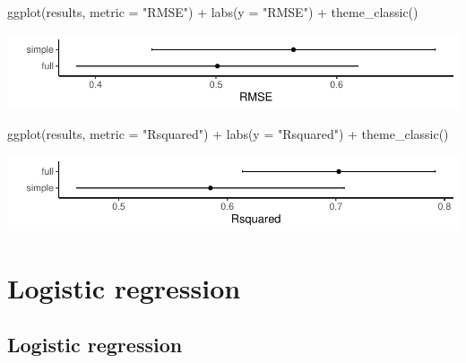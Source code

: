 \documentclass[a4paper]{article}\usepackage[]{graphicx}\usepackage[]{xcolor}
\makeatletter
\def\maxwidth{ %
  \ifdim\Gin@nat@width>\linewidth
    \linewidth
  \else
    \Gin@nat@width
  \fi
}
\makeatother
\begin{document}
\begin{Schunk}
{}

\begin{Sinput}
ggplot(results, metric = "RMSE") +
  labs(y = "RMSE") +
  theme_classic()
\end{Sinput}


{\centering \includegraphics[width=\maxwidth]{figure/listings-unnamed-chunk-407-2} 

}

\begin{Sinput}
ggplot(results, metric = "Rsquared") +
  labs(y = "Rsquared") +
  theme_classic()
\end{Sinput}


{\centering \includegraphics[width=\maxwidth]{figure/listings-unnamed-chunk-407-3} 

}

\end{Schunk}
\newpage

\section{Logistic regression}\label{sec:31}
\subsection{Logistic regression}
\end{document}
